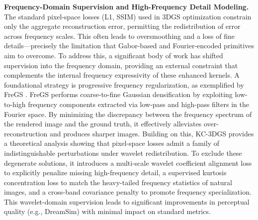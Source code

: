 \documentclass[11pt]{article}
\begin{document}
\textbf{Frequency-Domain Supervision and High-Frequency Detail Modeling.} The standard pixel-space losses (L1, SSIM) used in 3DGS optimization constrain only the aggregate reconstruction error, permitting the redistribution of error across frequency scales. This often leads to oversmoothing and a loss of fine details---precisely the limitation that Gabor-based and Fourier-encoded primitives aim to overcome. To address this, a significant body of work has shifted supervision into the frequency domain, providing an external constraint that complements the internal frequency expressivity of these enhanced kernels. A foundational strategy is progressive frequency regularization, as exemplified by FreGS \cite{ref75}. FreGS performs coarse-to-fine Gaussian densification by exploiting low-to-high frequency components extracted via low-pass and high-pass filters in the Fourier space. By minimizing the discrepancy between the frequency spectrum of the rendered image and the ground truth, it effectively alleviates over-reconstruction and produces sharper images. Building on this, KC-3DGS \cite{ref76} provides a theoretical analysis showing that pixel-space losses admit a family of indistinguishable perturbations under wavelet redistribution. To exclude these degenerate solutions, it introduces a multi-scale wavelet coefficient alignment loss to explicitly penalize missing high-frequency detail, a supervised kurtosis concentration loss to match the heavy-tailed frequency statistics of natural images, and a cross-band covariance penalty to promote frequency specialization. This wavelet-domain supervision leads to significant improvements in perceptual quality (e.g., DreamSim) with minimal impact on standard metrics.
\end{document}
